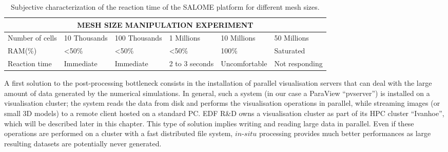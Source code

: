 \begin{table}
\centering
\begin{tabular}{|p{1.5cm}|p{2.0cm}|p{2.20cm}|p{1.50cm}|p{2cm}|p{2cm}|}
\hline
\multicolumn{6}{|c|}{\textbf{MESH SIZE MANIPULATION EXPERIMENT}}\\
\hline
Number of cells & 10 Thousands & 100 Thousands & 1 Millions & 10 Millions & 50 Millions \\
\hline
RAM(\%) & <50\% & <50\% & <50\% & 100\% & Saturated \\
\hline
Reaction time & Immediate & Immediate & 2 to 3 seconds & Uncomfortable & Not responding \\
\hline
\end{tabular}
\caption{Subjective characterization of the reaction time of the SALOME platform for different mesh sizes.}
\label{fig:tabmot}
\vspace{-0.15in}
\end{table}

A first solution to the post-processing bottleneck consists in the installation 
of parallel visualisation servers that can deal with the large amount of data generated 
by the numerical simulations. In general, such
a system (in our case a ParaView ``pvserver'') is installed on a visualisation
cluster; the system reads the data from disk and performs the visualisation operations in
parallel, while streaming images (or small 3D models) to a remote client hosted on a standard PC. 
EDF R\&D owns a visualisation cluster as part of its HPC cluster ``Ivanhoe'', which will
be described later in this chapter. This type of solution implies writing and 
reading large data in parallel. Even if
these operations are performed on a cluster with a fast distributed file system,
$in$-$situ$ processing provides much better performances as large resulting datasets 
are potentially never generated. 

